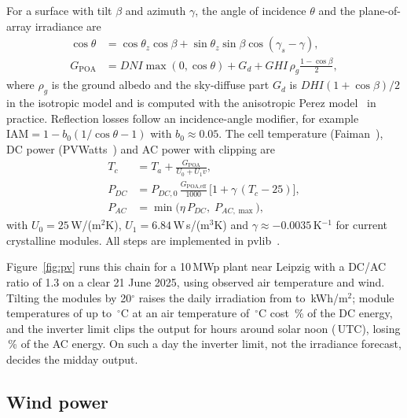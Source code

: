For a surface with tilt $\beta$ and azimuth $\gamma$, the angle of incidence $\theta$ and the plane-of-array irradiance are
\begin{align}
\cos\theta&=\cos\theta_z\cos\beta+\sin\theta_z\sin\beta\cos(\gamma_s-\gamma),\\
G_{\text{POA}}&=DNI\max(0,\cos\theta)+G_{d}+GHI\,\rho_g\tfrac{1-\cos\beta}{2}, \label{eq:poa}
\end{align}
where $\rho_g$ is the ground albedo and the sky-diffuse part $G_d$ is $DHI(1+\cos\beta)/2$ in the isotropic model and is computed with the anisotropic Perez model~\cite{perez1990modeling} in practice. Reflection losses follow an incidence-angle modifier, for example $\text{IAM}=1-b_0(1/\cos\theta-1)$ with $b_0\approx0.05$. The cell temperature (Faiman~\cite{faiman2008temperature}), DC power (PVWatts~\cite{dobos2014pvwatts}) and AC power with clipping are
\begin{align}
T_c&=T_a+\frac{G_{\text{POA}}}{U_0+U_1v}, \label{eq:faiman}\\
P_{DC}&=P_{DC,0}\,\frac{G_{\text{POA,eff}}}{1000}\,\big[1+\gamma\,(T_c-25)\big], \label{eq:pvwatts}\\
P_{AC}&=\min\big(\eta\,P_{DC},\;P_{AC,\max}\big), \label{eq:clip}
\end{align}
with $U_0=25$\,W/(m$^2$K), $U_1=6.84$\,W\,s/(m$^3$K) and $\gamma\approx-0.0035$\,K$^{-1}$ for current crystalline modules. All steps are implemented in pvlib~\cite{holmgren2018pvlib}.

Figure~\ref{fig:pv} runs this chain for a 10\,MWp plant near Leipzig with a DC/AC ratio of 1.3 on a clear 21 June 2025, using observed air temperature and wind. Tilting the modules by 20$^\circ$ raises the daily irradiation from \valPvGhiKwh{} to \valPvPoaKwh{}\,kWh/m$^2$; module temperatures of up to \valPvMaxCellTemp\,$^\circ$C at an air temperature of \valPvMaxAirTemp\,$^\circ$C cost \valPvTempLossPct\,\% of the DC energy, and the inverter limit clips the output for \valPvClipHours{} hours around solar noon (\valPvSolarNoonUtc\,UTC), losing \valPvClipLossPct\,\% of the AC energy. On such a day the inverter limit, not the irradiance forecast, decides the midday output.



\subsection{Wind power}

